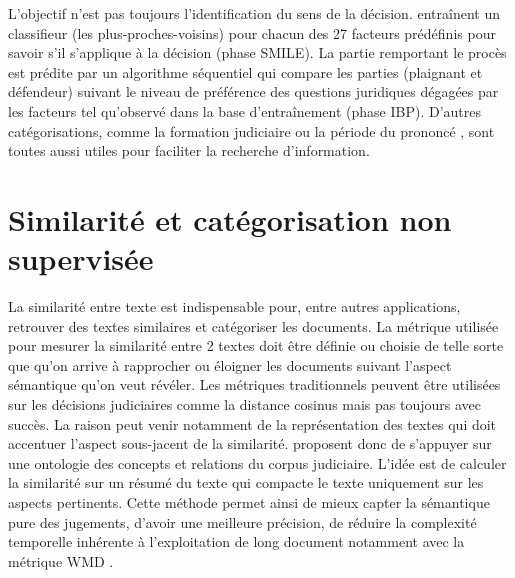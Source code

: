 L'objectif n'est pas toujours l'identification du sens de la décision. \cite{Ashley2009classifCases} entraînent un classifieur (les plus-proches-voisins) pour chacun des 27 facteurs prédéfinis pour savoir s'il s'applique à la décision (phase SMILE). La partie remportant le procès est prédite par un algorithme séquentiel qui compare les parties (plaignant et défendeur) suivant le niveau de préférence des questions juridiques dégagées par les facteurs tel qu'observé dans la base d'entraînement (phase IBP).  D'autres catégorisations, comme la formation judiciaire ou la période du prononcé \citep{Sulea2017predictareadecision,sulea2017legalEnsSVM}, sont toutes aussi utiles pour faciliter la recherche d'information.

\section{Similarité et catégorisation non supervisée}

La similarité entre texte est indispensable pour, entre autres applications, retrouver des textes similaires et catégoriser les documents. La métrique utilisée pour mesurer la similarité entre 2 textes doit être définie ou choisie de telle sorte que qu'on arrive à rapprocher ou éloigner les documents suivant l'aspect sémantique qu'on veut révéler. Les métriques traditionnels peuvent être utilisées sur les décisions judiciaires comme la distance cosinus \citep{thenmozhi2017legalprecedretriev} mais pas toujours avec succès. La raison peut venir notamment de la représentation des textes qui doit accentuer l'aspect sous-jacent de la similarité. \citet{ma2018wmdchinesecase} proposent donc de s'appuyer sur une ontologie des concepts et relations du corpus judiciaire. L'idée est de calculer la similarité sur un résumé du texte qui compacte le texte uniquement sur les aspects pertinents. Cette méthode permet ainsi de mieux capter la sémantique pure des jugements, d'avoir une meilleure précision, de réduire la complexité temporelle inhérente à l'exploitation de long document notamment avec la métrique WMD \citep{kusner2015wordmoverdist}.

